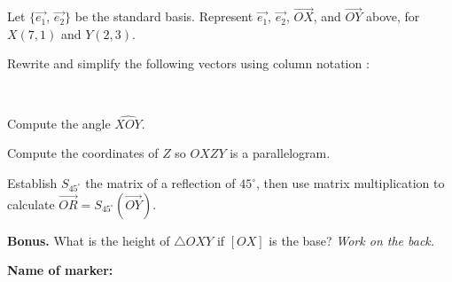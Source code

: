 \documentclass[9pt]{exam}
\begin{document}
\vspace{-5mm}

\begin{center}
\end{center}



\begin{questions} 
\question[4] Let $\{\overrightarrow{e_1}$, $\overrightarrow{e_2}\}$ be the standard basis. Represent $\overrightarrow{e_1}$, $\overrightarrow{e_2}$, $\overrightarrow{OX}$, and $\overrightarrow{OY}$ above, for $X(7, 1)$ and $Y(2, 3)$.

\question[4] Rewrite and simplify the following vectors using column notation :

\


\question[3] Compute the angle $\widehat{XOY}$.

\question[3] Compute the coordinates of $Z$ so $OXZY$ is a parallelogram.

\question[3] Establish $S_{45^\circ}$ the matrix of a reflection of $45^\circ$, then use matrix multiplication to calculate $\overrightarrow{OR} = S_{45^\circ} (\overrightarrow{OY})$.

\question[0] \textbf{Bonus.} 
What is the height of $\triangle OXY$ if $[OX]$ is the base?
\hfill \emph{Work on the back.}

\end{questions}


\begin{tcolorbox}

\textbf{Name of marker:}

\begin{center}
\gradetable[h][questions]
\end{center}

\end{tcolorbox}
\end{document}

